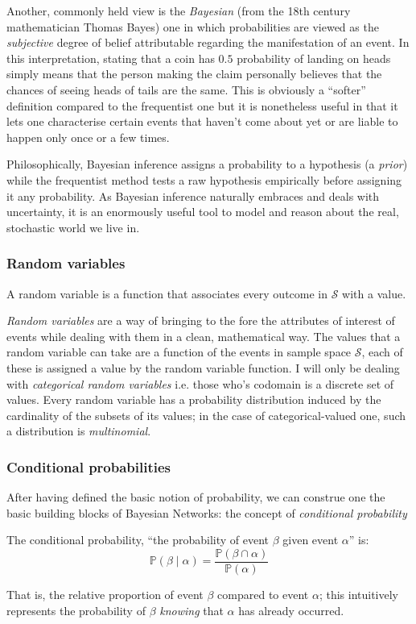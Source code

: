 Another, commonly held view is the \textit{Bayesian} (from the 18th century mathematician Thomas Bayes) one in which probabilities are viewed as the \textit{subjective} degree of belief attributable regarding the manifestation of an event.
In this interpretation, stating that a coin has $0.5$ probability of landing on heads simply means that the person making the claim personally believes that the chances of seeing heads of tails are the same.
This is obviously a ``softer'' definition compared to the frequentist one but it is nonetheless useful in that it lets one characterise certain events that haven't come about yet or are liable to happen only once or a few times.

Philosophically, Bayesian inference assigns a probability to a hypothesis (a \textit{prior}) while the frequentist method tests a raw hypothesis empirically before assigning it any probability.
As Bayesian inference naturally embraces and deals with uncertainty, it is an enormously useful tool to model and reason about the real, stochastic world we live in.

\subsubsection{Random variables}
\begin{definition}
	A random variable is a function that associates every outcome in $\mathcal{S}$ with a value.
\end{definition}
\textit{Random variables} are a way of bringing to the fore the attributes of interest of events while dealing with them in a clean, mathematical way.
The values that a random variable can take are a function of the events in sample space $\mathcal{S}$, each of these is assigned a value by the random variable function.
I will only be dealing with \textit{categorical random variables} i.e. those who's codomain is a discrete set of values.
Every random variable has a probability distribution induced by the cardinality of the subsets of its values; in the case of categorical-valued one, such a distribution is \textit{multinomial}.

\subsubsection{Conditional probabilities}
After having defined the basic notion of probability, we can construe one the basic building blocks of Bayesian Networks: the concept of \textit{conditional probability} 
\begin{definition}
	The conditional probability, ``the probability of event $\beta$ given event $\alpha$'' is:
\begin{equation} \label{eq:conditionalprobability}
\mathbb{P}(\beta \mid \alpha) = \frac{\mathbb{P}(\beta \cap \alpha)}{\mathbb{P}(\alpha)}
\end{equation}
\end{definition}
That is, the relative proportion of event $\beta$ compared to event $\alpha$; this intuitively represents the probability of $\beta$ \textit{knowing} that $\alpha$ has already occurred.

